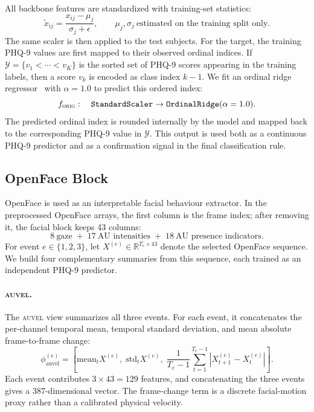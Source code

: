 \documentclass[sigconf,screen,review]{acmart}
\begin{document}
All backbone features are standardized with training-set statistics:
\begin{equation}
\tilde{x}_{ij} =
\frac{x_{ij}-\mu_j}{\sigma_j+\epsilon},
\qquad
\mu_j,\sigma_j\ \text{estimated on the training split only}.
\label{eq:standardize}
\end{equation}
The same scaler is then applied to the test subjects. For the target, the
training PHQ-9 values are first mapped to their observed ordinal indices. If
$\mathcal{Y}=\{v_1<\cdots<v_K\}$ is the sorted set of PHQ-9 scores appearing in
the training labels, then a score $v_k$ is encoded as class index $k-1$. We fit
an ordinal ridge regressor~\cite{mord} with $\alpha=1.0$ to predict this ordered
index:
\begin{equation}
f_{\textsc{orig}}:
\quad
\texttt{StandardScaler}
\rightarrow
\texttt{OrdinalRidge}(\alpha=1.0).
\label{eq:orig-model}
\end{equation}
The predicted ordinal index is rounded internally by the model and mapped back
to the corresponding PHQ-9 value in $\mathcal{Y}$. This output is used both as a
continuous PHQ-9 predictor and as a confirmation signal in the final
classification rule.

\subsection{OpenFace Block}
\label{sec:method-openface}

OpenFace is used as an interpretable facial behaviour extractor. In the
preprocessed OpenFace arrays, the first column is the frame index; after
removing it, the facial block keeps 43 columns:
\begin{equation}
8\ \text{gaze} \;+\; 17\ \text{AU intensities}
\;+\; 18\ \text{AU presence indicators}.
\end{equation}
For event $e\in\{1,2,3\}$, let
$X^{(e)}\in\mathbb{R}^{T_e\times43}$ denote the selected OpenFace sequence. We
build four complementary summaries from this sequence, each trained as an
independent PHQ-9 predictor.

\paragraph{\textsc{auvel}.}
The \textsc{auvel} view summarizes all three events. For each event, it
concatenates the per-channel temporal mean, temporal standard deviation, and
mean absolute frame-to-frame change:
\begin{equation}
\phi^{(e)}_{\text{auvel}} =
\left[
\mathrm{mean}_t X^{(e)},\;
\mathrm{std}_t X^{(e)},\;
\frac{1}{T_e-1}\sum_{t=1}^{T_e-1}
\left|X^{(e)}_{t+1}-X^{(e)}_t\right|
\right].
\label{eq:auvel}
\end{equation}
Each event contributes $3\times43=129$ features, and concatenating the three
events gives a 387-dimensional vector. The frame-change term is a discrete
facial-motion proxy rather than a calibrated physical velocity.
\end{document}
